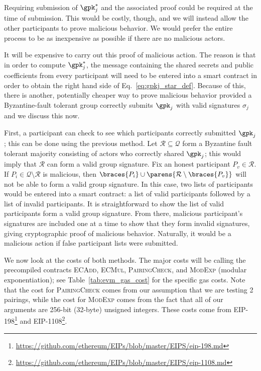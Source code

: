\noindent
Requiring submission of $\gpk_{j}^{*}$ and the associated
proof could be required at the time of submission.
This would be costly, though, and we will instead allow
the other participants to prove malicious behavior.
We would prefer the entire process to be as inexpensive
as possible if there are no malicious actors.

It will be expensive to carry out this proof of malicious action.
The reason is that in order to compute $\gpk_{j}^{*}$,
the message containing the shared secrets and public coefficients
from every participant will need to be entered into a smart contract
in order to obtain the right hand side of
Eq.~\eqref{eq:gpkj_star_def}.
Because of this, there is another, potentially cheaper way to prove malicious
behavior provided a Byzantine-fault tolerant group
correctly submits $\gpk_{j}$ with valid signatures $\sigma_{j}$
and we discuss this now.

First, a participant can check to see which participants
correctly submitted $\gpk_{j}$;
this can be done using the previous method.
Let $\mathcal{R}\subseteq\mathcal{Q}$ form a Byzantine fault tolerant
majority consisting of actors who correctly shared $\gpk_{j}$;
this would imply that $\mathcal{R}$ can form a valid group signature.
Fix an honest participant $P_{v}\in\mathcal{R}$.
If $P_{i}\in\mathcal{Q}\setminus\mathcal{R}$ is malicious,
then $\braces{P_{i}}\cup\parens{\mathcal{R}\setminus \braces{P_{v}}}$
will not be able to form a valid group signature.
In this case, two lists of participants would be entered into a smart
contract: a list of valid participants followed by a list of
invalid participants.
It is straightforward to show the list of valid
participants form a valid group signature.
From there, malicious participant's signatures are included 
one at a time to show that they form invalid signatures,
giving cryptographic proof of malicious behavior.
Naturally, it would be a malicious action if false participant
lists were submitted.

We now look at the costs of both methods.
The major costs will be calling the precompiled contracts
\textsc{ECAdd}, \textsc{ECMul}, \textsc{PairingCheck},
and \textsc{ModExp} (modular exponentiation);
see Table~\ref{tab:evm_gas_cost} for the specific gas costs.
Note that the cost for \textsc{PairingCheck} comes
from our assumption that we are testing 2 pairings,
while the cost for \textsc{ModExp} comes from the fact
that all of our arguments are 256-bit (32-byte) unsigned integers.
These costs come from EIP-198\footnote{
    \url{https://github.com/ethereum/EIPs/blob/master/EIPS/eip-198.md}}
and EIP-1108\footnote{
    \url{https://github.com/ethereum/EIPs/blob/master/EIPS/eip-1108.md}}.

